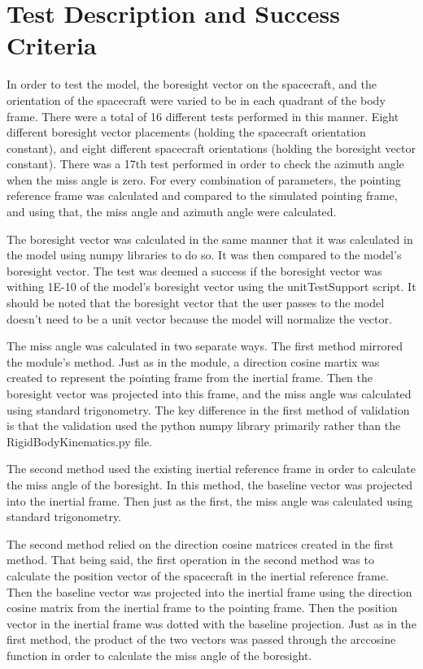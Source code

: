 \section{Test Description and Success Criteria}
In order to test the model, the boresight vector on the spacecraft, and the orientation of the spacecraft were varied to be in each quadrant of the body frame. There were a total of 16 different tests performed in this manner. Eight different boresight vector placements (holding the spacecraft orientation constant), and eight different spacecraft orientations (holding the boresight vector constant). There was a 17th test performed in order to check the azimuth angle when the miss angle is zero. For every combination of parameters, the pointing reference frame was calculated and compared to the simulated pointing frame, and using that, the miss angle and azimuth angle were calculated.

The boresight vector was calculated in the same manner that it was calculated in the model using numpy libraries to do so. It was then compared to the model's boresight vector. The test was deemed a success if the boresight vector was withing 1E-10 of the model's boresight vector using the unitTestSupport script. It should be noted that the boresight vector that the user passes to the model doesn't need to be a unit vector because the model will normalize the vector.  

The miss angle was calculated in two separate ways. The first method mirrored the module's method. Just as in the module, a direction cosine martix was created to represent the pointing frame from the inertial frame. Then the boresight vector was projected into this frame, and the miss angle was calculated using standard trigonometry. The key difference in the first method of validation is that the validation used the python numpy library primarily rather than the RigidBodyKinematics.py file.  

The second method used the existing inertial reference frame in order to calculate the miss angle of the boresight. In this method, the baseline vector was projected into the inertial frame. Then just as the first, the miss angle was calculated using standard trigonometry.

The second method relied on the direction cosine matrices created in the first method. That being said, the first operation in the second method was to calculate the position vector of the spacecraft in the inertial reference frame. Then the baseline vector was projected into the inertial frame using the direction cosine matrix from the inertial frame to the pointing frame. Then the position vector in the inertial frame was dotted with the baseline projection. Just as in the first method, the product of the two vectors was passed through the arccosine function in order to calculate the miss angle of the boresight. 

